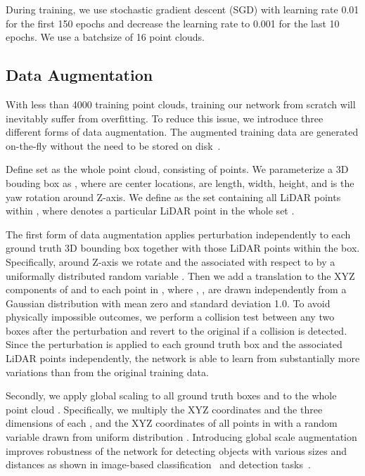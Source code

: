 \documentclass[10pt,twocolumn,letterpaper]{article}
\begin{document}
During training, we use stochastic gradient descent (SGD) with learning rate 0.01 for the first 150 epochs and decrease the learning rate to 0.001 for the last 10 epochs. We use a batchsize of 16 point clouds.



\subsection{Data Augmentation}
With less than 4000 training point clouds, training our network from scratch will inevitably suffer from overfitting. To reduce this issue, we introduce three different forms of data augmentation. The augmented training data are generated on-the-fly without the need to be stored on disk~\cite{REF:NIPS2012_4824}. 


Define set  as the whole point cloud, consisting of  points.
We parameterize a  3D bouding box  as , where  are center locations,  are length, width, height, and  is the yaw rotation around Z-axis. We define  as the set containing all LiDAR points within , where  denotes a particular LiDAR point in the whole set .

The first form of data augmentation applies perturbation independently to each ground truth 3D bounding box together with those LiDAR points within the box. Specifically, around Z-axis we rotate  and the associated  with respect to  by a uniformally distributed random variable . Then we add a translation  to the XYZ components of  and to each point in , where , ,  are drawn independently from a Gaussian distribution with mean zero and standard deviation 1.0. To avoid physically impossible outcomes, we perform a collision test between any two boxes after the perturbation and revert to the original if a collision is detected. Since the perturbation is applied to each ground truth box and the associated LiDAR points independently, the network is able to learn from substantially more variations than from the original training data.

Secondly, we apply global scaling to all ground truth boxes  and to the whole point cloud . Specifically, we multiply the XYZ coordinates and the three dimensions of each , and the XYZ coordinates of all points in  with a random variable drawn from uniform distribution . Introducing global scale augmentation improves robustness of the network for detecting objects with various sizes and distances as shown in image-based classification~\cite{REF:Simonyan14c, REF:journals/corr/Howard13} and detection tasks~\cite{REF:Girshick:2015, REF:ResNet2016}.
\end{document}
